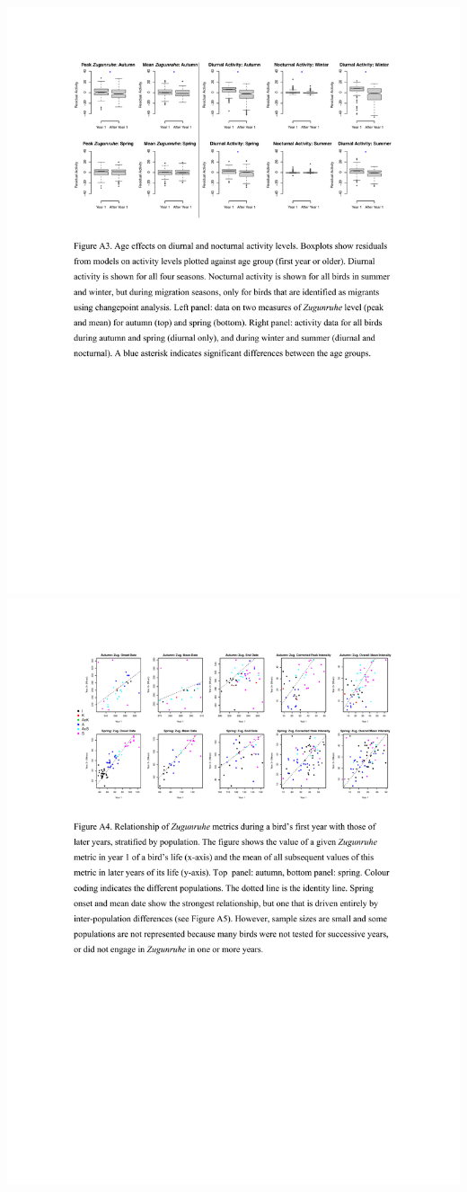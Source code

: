 \documentclass[a4paper, twoside]{templates/ociamthesis}
\begin{document}
\includegraphics[width=1\linewidth]{pdf_chapters/zug/zug_supp_crop_Part14}
\includegraphics[width=1\linewidth]{pdf_chapters/zug/zug_supp_crop_Part15}
\end{document}
